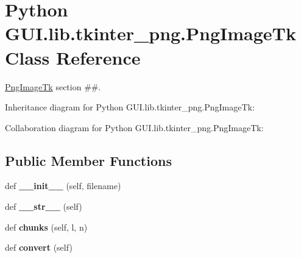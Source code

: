 \hypertarget{class_python_01_g_u_i_1_1lib_1_1tkinter__png_1_1_png_image_tk}{}\section{Python G\+U\+I.\+lib.\+tkinter\+\_\+png.\+Png\+Image\+Tk Class Reference}
\label{class_python_01_g_u_i_1_1lib_1_1tkinter__png_1_1_png_image_tk}


\hyperlink{class_python_01_g_u_i_1_1lib_1_1tkinter__png_1_1_png_image_tk}{Png\+Image\+Tk} section \#\#.  




Inheritance diagram for Python G\+U\+I.\+lib.\+tkinter\+\_\+png.\+Png\+Image\+Tk\+:


Collaboration diagram for Python G\+U\+I.\+lib.\+tkinter\+\_\+png.\+Png\+Image\+Tk\+:
\subsection*{Public Member Functions}
\begin{DoxyCompactItemize}
\item 
\mbox{\label{class_python_01_g_u_i_1_1lib_1_1tkinter__png_1_1_png_image_tk_affb7026a286538f0144e6d0694c780c5}} 
def {\bfseries \+\_\+\+\_\+init\+\_\+\+\_\+} (self, filename)
\item 
\mbox{\label{class_python_01_g_u_i_1_1lib_1_1tkinter__png_1_1_png_image_tk_a8f9c77a75501d91e761aba3b0714423f}} 
def {\bfseries \+\_\+\+\_\+str\+\_\+\+\_\+} (self)
\item 
\mbox{\label{class_python_01_g_u_i_1_1lib_1_1tkinter__png_1_1_png_image_tk_a6029bc28d3027353a03ec96f5d0b9d17}} 
def {\bfseries chunks} (self, l, n)
\item 
\mbox{\label{class_python_01_g_u_i_1_1lib_1_1tkinter__png_1_1_png_image_tk_a292fadcf0aa087360b6114f2613ab24e}} 
def {\bfseries convert} (self)
\end{DoxyCompactItemize}
